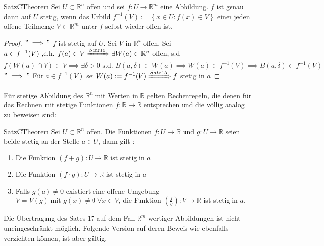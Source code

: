\documentclass[11.5 pt, a4paper]{memoir}
\begin{document}
\begin{ibox}[16]{Satz}{CTheorem}
    Sei $ U \subset  \mathbb{R}^n  $ offen und sei $ f: U \to \mathbb{R}^m $ eine Abbildung. $ f $ ist genau dann auf $ U  $ stetig,
	wenn das Urbild $ f^{-1}(V) := \left\{ x \in U : f(x) \in V \right\}  $ einer jeden offene Teilmenge $ V \subset  \mathbb{R}^m $ unter
	$ f $ selbst wieder offen ist.
\end{ibox}

\begin{proof}
	$ " \implies" $ $ f $ ist stetig auf $ U $. Sei $ V  $ in $ \mathbb{R}^n  $ offen. Sei $ a \in  f^{-1}(V) \text{ ,d.h. } f(a) 
	\in  V  \xRightarrow{Satz 15} \exists W(a) \subset  \mathbb{R}^n $ offen, s.d $ f(W(a) \cap V) \subset  V \implies  \exists \delta
> 0 \text{ s.d. } B(a, \delta) \subset  W(a) \implies  W(a) \subset  f^{-1}(V) \implies  B(a, \delta) \subset  f^{-1}(V)$ \\
$ " \implies " $ Für $ a \in f^{-1}(V) $ sei $ W(a) := f^{-1}(V) \xRightarrow{Satz 15} f $ stetig in $ a $  
\end{proof}


Für stetige Abbildung des $ \mathbb{R}^n  $ mit Werten in $ \mathbb{R}  $ 
gelten Rechenregeln, die denen für das Rechnen mit stetige Funktionen $ f: \mathbb{R}  \to \mathbb{R}  $ entsprechen und die völlig
analog zu beweisen sind:

\begin{ibox}[17]{Satz}{CTheorem}
    Sei $ U \subset \mathbb{R}^n  $ offen. Die Funktionen $ f : U \to \mathbb{R} \text{ und } g : U \to \mathbb{R}  $ seien beide 
	stetig an der Stelle $ a \in  U $, dann gilt :
	\begin{enumerate}[label=\alph*)]
		\item Die Funktion $ (f+g):U \to \mathbb{R}  $ ist stetig in $ a $ 
		\item Die Funktion $ (f \cdot g) : U \to \mathbb{R}  $ ist stetig in $ a $ 
		\item Falls $ g(a) \neq 0 $ existiert eine offene Umgebung $ V = V(g) \text{ mit } g(x) \neq 0 \; \forall x \in  V $,
			die Funktion $ \left( \frac{f}{g}\right) : V \to \mathbb{R}    $ ist stetig in $ a $.  
	\end{enumerate}
	
\end{ibox}

Die Übertragung des Sates 17 auf dem Fall $ \mathbb{R}^m  $-wertiger Abbildungen ist nicht uneingeschränkt möglich. Folgende Version auf 
deren Beweis wie ebenfalls verzichten können, ist aber gültig. 
\end{document}
